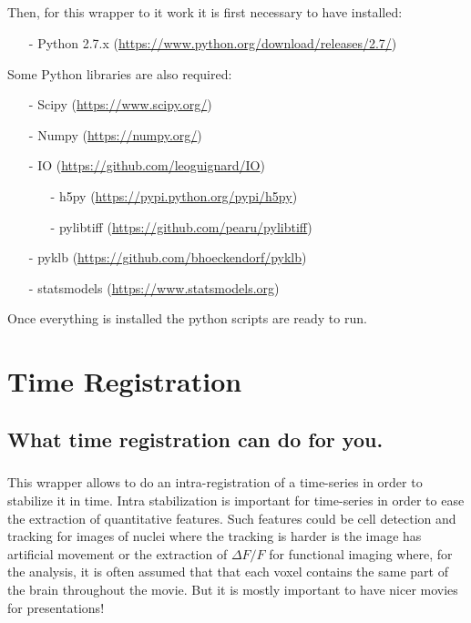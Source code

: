 \documentclass[10pt,a4paper]{book}
\begin{document}
\paragraph{}Then, for this wrapper to it work it is first necessary to have installed:
\begin{enumerate}
\item[-] Python 2.7.x (\url{https://www.python.org/download/releases/2.7/})
\end{enumerate}
Some Python libraries are also required:
\begin{enumerate}
\item[-] Scipy (\url{https://www.scipy.org/})
\item[-] Numpy (\url{https://numpy.org/})
\item[-] IO (\url{https://github.com/leoguignard/IO})
\begin{enumerate}
\item[-] h5py (\url{https://pypi.python.org/pypi/h5py})
\item[-] pylibtiff (\url{https://github.com/pearu/pylibtiff})
\end{enumerate}
\item[-] pyklb (\url{https://github.com/bhoeckendorf/pyklb})
\item[-] statsmodels (\url{https://www.statsmodels.org})
\end{enumerate}
Once everything is installed the python scripts are ready to run.
\chapter{Time Registration}
\section{What time registration can do for you.}
\paragraph{}This wrapper allows to do an intra-registration of a time-series in order to stabilize it in time. Intra stabilization is important for time-series in order to ease the extraction of quantitative features. Such features could be cell detection and tracking for images of nuclei where the tracking is harder is the image has artificial movement or the extraction of $\Delta F/F$ for functional imaging where, for the analysis, it is often assumed that that each voxel contains the same part of the brain throughout the movie. But it is mostly important to have nicer movies for presentations!
\end{document}
